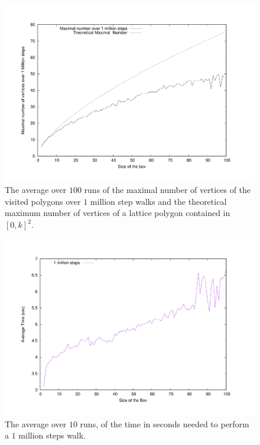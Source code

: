 



\begin{figure}[h!]
  \centering
  \includegraphics[scale=0.3]{max1M}
  \caption{The average over $100$ runs of the maximal number of vertices of the visited polygons over $1$ million step walks and the theoretical maximum number of vertices of a lattice polygon contained in $[0,k]^2$.}
  \label{Fig.Nlim}
\end{figure}
\begin{figure}[h!]
  \centering
  \includegraphics[scale=0.3]{averageTime}
  \caption{The average over $10$ runs, of the time in seconds needed to perform a $1$ million steps walk.}
  \label{Fig.Nlim}
\end{figure}

